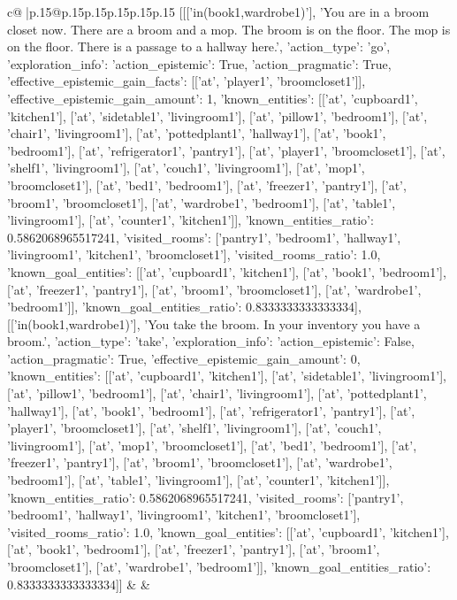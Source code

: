 \documentclass{article}
\begin{document}
{\begin{supertabular}{c@{$\;$}|p{.15\linewidth}@{}p{.15\linewidth}p{.15\linewidth}p{.15\linewidth}p{.15\linewidth}p{.15\linewidth}}
{{{	 [[['in(book1,wardrobe1)'], 'You are in a broom closet now. There are a broom and a mop. The broom is on the floor. The mop is on the floor. There is a passage to a hallway here.', {'action_type': 'go', 'exploration_info': {'action_epistemic': True, 'action_pragmatic': True, 'effective_epistemic_gain_facts': [['at', 'player1', 'broomcloset1']], 'effective_epistemic_gain_amount': 1, 'known_entities': [['at', 'cupboard1', 'kitchen1'], ['at', 'sidetable1', 'livingroom1'], ['at', 'pillow1', 'bedroom1'], ['at', 'chair1', 'livingroom1'], ['at', 'pottedplant1', 'hallway1'], ['at', 'book1', 'bedroom1'], ['at', 'refrigerator1', 'pantry1'], ['at', 'player1', 'broomcloset1'], ['at', 'shelf1', 'livingroom1'], ['at', 'couch1', 'livingroom1'], ['at', 'mop1', 'broomcloset1'], ['at', 'bed1', 'bedroom1'], ['at', 'freezer1', 'pantry1'], ['at', 'broom1', 'broomcloset1'], ['at', 'wardrobe1', 'bedroom1'], ['at', 'table1', 'livingroom1'], ['at', 'counter1', 'kitchen1']], 'known_entities_ratio': 0.5862068965517241, 'visited_rooms': ['pantry1', 'bedroom1', 'hallway1', 'livingroom1', 'kitchen1', 'broomcloset1'], 'visited_rooms_ratio': 1.0, 'known_goal_entities': [['at', 'cupboard1', 'kitchen1'], ['at', 'book1', 'bedroom1'], ['at', 'freezer1', 'pantry1'], ['at', 'broom1', 'broomcloset1'], ['at', 'wardrobe1', 'bedroom1']], 'known_goal_entities_ratio': 0.8333333333333334}}], [['in(book1,wardrobe1)'], 'You take the broom. In your inventory you have a broom.', {'action_type': 'take', 'exploration_info': {'action_epistemic': False, 'action_pragmatic': True, 'effective_epistemic_gain_amount': 0, 'known_entities': [['at', 'cupboard1', 'kitchen1'], ['at', 'sidetable1', 'livingroom1'], ['at', 'pillow1', 'bedroom1'], ['at', 'chair1', 'livingroom1'], ['at', 'pottedplant1', 'hallway1'], ['at', 'book1', 'bedroom1'], ['at', 'refrigerator1', 'pantry1'], ['at', 'player1', 'broomcloset1'], ['at', 'shelf1', 'livingroom1'], ['at', 'couch1', 'livingroom1'], ['at', 'mop1', 'broomcloset1'], ['at', 'bed1', 'bedroom1'], ['at', 'freezer1', 'pantry1'], ['at', 'broom1', 'broomcloset1'], ['at', 'wardrobe1', 'bedroom1'], ['at', 'table1', 'livingroom1'], ['at', 'counter1', 'kitchen1']], 'known_entities_ratio': 0.5862068965517241, 'visited_rooms': ['pantry1', 'bedroom1', 'hallway1', 'livingroom1', 'kitchen1', 'broomcloset1'], 'visited_rooms_ratio': 1.0, 'known_goal_entities': [['at', 'cupboard1', 'kitchen1'], ['at', 'book1', 'bedroom1'], ['at', 'freezer1', 'pantry1'], ['at', 'broom1', 'broomcloset1'], ['at', 'wardrobe1', 'bedroom1']], 'known_goal_entities_ratio': 0.8333333333333334}}]] 
	  } 
	   } 
	   } 
	 & & \\ 
 


\end{supertabular}}
\end{document}
